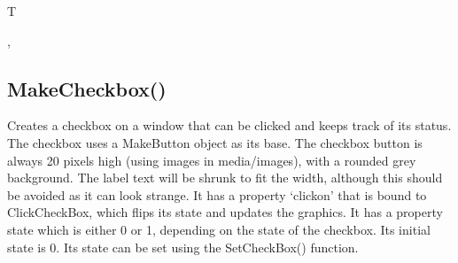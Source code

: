 \documentclass[letterpaper,10pt,english]{sphinxmanual}
\begin{document}
\begin{sphinxVerbatim}[commandchars=\\\{\}]
\end{sphinxVerbatim}

\sphinxAtStartPar
{}

\begin{sphinxVerbatim}[commandchars=\\\{\}]
T


\PYG{p}{[}\PYG{p}{]}\PYG{p}{[}\PYG{p}{]}
\PYG{p}{[}\PYG{p}{]}
\end{sphinxVerbatim}

\sphinxAtStartPar
{}

\sphinxAtStartPar
{}, 

\ignorespaces 

\subsection{MakeCheckbox()}
\label{\detokenize{reference/ui:makecheckbox}}\label{\detokenize{reference/ui:index-14}}
\sphinxAtStartPar
{}

\sphinxAtStartPar
{}

\sphinxAtStartPar
Creates a checkbox on a window that can be clicked and keeps track of its status. The checkbox uses a MakeButton object as its base. The checkbox button is always 20 pixels high (using images in media/images), with a rounded grey background. The label text will be shrunk to fit the width, although this should be avoided as it can look strange. It has a property ‘clickon’ that is bound to ClickCheckBox, which flips its state and updates the graphics. It has a property state which is either 0 or 1, depending on the state of the checkbox. Its initial state is 0. Its state can be set using the SetCheckBox() function.
\end{document}
